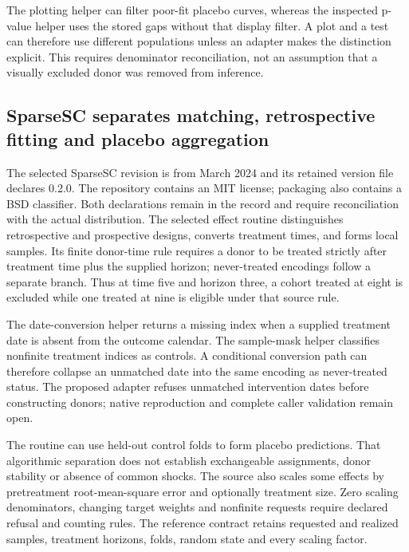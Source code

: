 The plotting helper can filter poor-fit placebo curves, whereas the inspected
p-value helper uses the stored gaps without that display filter. A plot and
a test can therefore use different populations unless an adapter makes the
distinction explicit. This requires denominator reconciliation, not an
assumption that a visually excluded donor was removed from inference.
\citep{exec25_synthpy_pysyncon}

\subsection{SparseSC separates matching, retrospective fitting and placebo aggregation}
The selected SparseSC revision is from March 2024 and its retained version
file declares 0.2.0. The repository contains an MIT license; packaging also
contains a BSD classifier. Both declarations remain in the record and require
reconciliation with the actual distribution. The selected effect routine
distinguishes retrospective and prospective designs, converts treatment
times, and forms local samples. Its finite donor-time rule requires a donor
to be treated strictly after treatment time plus the supplied horizon;
never-treated encodings follow a separate branch. Thus at time five and
horizon three, a cohort treated at eight is excluded while one treated at
nine is eligible under that source rule.\citep{exec25_synthpy_sparse,
exec25_synthpy_choice}

The date-conversion helper returns a missing index when a supplied treatment
date is absent from the outcome calendar. The sample-mask helper classifies
nonfinite treatment indices as controls. A conditional conversion path can
therefore collapse an unmatched date into the same encoding as never-treated
status. The proposed adapter refuses unmatched intervention dates before
constructing donors; native reproduction and complete caller validation
remain open.\citep{exec25_synthpy_sparse}

The routine can use held-out control folds to form placebo predictions.
That algorithmic separation does not establish exchangeable assignments,
donor stability or absence of common shocks. The source also scales some
effects by pretreatment root-mean-square error and optionally treatment
size. Zero scaling denominators, changing target weights and nonfinite
requests require declared refusal and counting rules. The reference
contract retains requested and realized samples, treatment horizons,
folds, random state and every scaling factor.\citep{exec25_synthpy_sparse}

